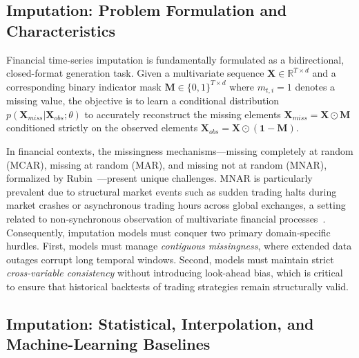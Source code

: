 \subsection{Imputation: Problem Formulation and Characteristics}
\label{sec:imputation}

Financial time-series imputation is fundamentally formulated as a bidirectional, closed-format generation task. Given a multivariate sequence $\mathbf{X} \in \mathbb{R}^{T \times d}$ and a corresponding binary indicator mask $\mathbf{M} \in \{0, 1\}^{T \times d}$ where $m_{t,i} = 1$ denotes a missing value, the objective is to learn a conditional distribution $p(\mathbf{X}_{miss} | \mathbf{X}_{obs}; \theta)$ to accurately reconstruct the missing elements $\mathbf{X}_{miss} = \mathbf{X} \odot \mathbf{M}$ conditioned strictly on the observed elements $\mathbf{X}_{obs} = \mathbf{X} \odot (\mathbf{1} - \mathbf{M})$.

In financial contexts, the missingness mechanisms—missing completely at random (MCAR), missing at random (MAR), and missing not at random (MNAR), formalized by Rubin~\citep{rubin1976inference}—present unique challenges. MNAR is particularly prevalent due to structural market events such as sudden trading halts during market crashes or asynchronous trading hours across global exchanges, a setting related to non-synchronous observation of multivariate financial processes~\citep{hayashi2005covariance}. Consequently, imputation models must conquer two primary domain-specific hurdles. First, models must manage \textit{contiguous missingness}, where extended data outages corrupt long temporal windows. Second, models must maintain strict \textit{cross-variable consistency} without introducing look-ahead bias, which is critical to ensure that historical backtests of trading strategies remain structurally valid.

\subsection{Imputation: Statistical, Interpolation, and Machine-Learning Baselines}

